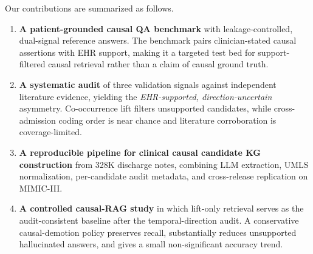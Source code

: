\documentclass[runningheads]{llncs}
\begin{document}
Our contributions are summarized as follows.
\begin{enumerate}
\item \textbf{A patient-grounded causal QA benchmark} with leakage-controlled, dual-signal reference answers. The benchmark pairs clinician-stated causal assertions with EHR support, making it a targeted test bed for support-filtered causal retrieval rather than a claim of causal ground truth.
\item \textbf{A systematic audit} of three validation signals against independent literature evidence, yielding the \emph{EHR-supported, direction-uncertain} asymmetry. Co-occurrence lift filters unsupported candidates, while cross-admission coding order is near chance and literature corroboration is coverage-limited.
\item \textbf{A reproducible pipeline for clinical causal candidate KG construction} from 328K discharge notes, combining LLM extraction, UMLS normalization, per-candidate audit metadata, and cross-release replication on MIMIC-III.
\item \textbf{A controlled causal-RAG study} in which lift-only retrieval serves as the audit-consistent baseline after the temporal-direction audit. A conservative causal-demotion policy preserves recall, substantially reduces unsupported hallucinated answers, and gives a small non-significant accuracy trend.
\end{enumerate}
\end{document}

